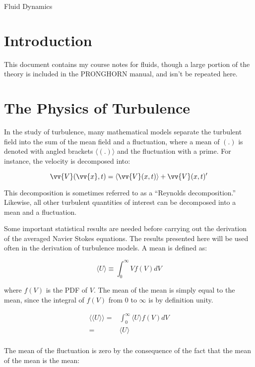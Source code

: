 \documentclass[10pt]{article}
\newcommand{\beq}{\begin{equation}}
\newcommand{\eeq}{\end{equation}}
\newcommand{\beqa}{\begin{equation}\begin{aligned}}
\newcommand{\eeqa}{\end{aligned}\end{equation}}
\newcommand{\la}{\langle}
\newcommand{\ra}{\rangle}
\begin{document}
\begin{centering}
\large Fluid Dynamics\\
\end{centering}

\tableofcontents
\clearpage

\section{Introduction}
\begin{flushleft}\justify

This document contains my course notes for fluids, though a large portion of the theory is included in the PRONGHORN manual, and isn't be repeated here.

\section{The Physics of Turbulence}

In the study of turbulence, many mathematical models separate the turbulent field into the sum of the mean field and a fluctuation, where a mean of \((.)\) is denoted with angled brackets \(\la(.)\ra\) and the fluctuation with a prime. For instance, the velocity is decomposed into:

\beq
\vv{V}(\vv{x},t)=\la\vv{V}(x,t)\rangle+\vv{V}(x,t)'
\eeq

This decomposition is sometimes referred to as a ``Reynolds decomposition.'' Likewise, all other turbulent quantities of interest can be decomposed into a mean and a fluctuation. 

\begin{tcolorbox}[breakable]
Some important statistical results are needed before carrying out the derivation of the averaged Navier Stokes equations. The results presented here will be used often in the derivation of turbulence models. A mean is defined as:

\beq
\la U\ra\equiv\int_{0}^{\infty}Vf(V)dV
\eeq

where \(f(V)\) is the PDF of \(V\). The mean of the mean is simply equal to the mean, since the integral of \(f(V)\) from 0 to \(\infty\) is by definition unity. 

\beqa
\la\la U\ra\ra=&\int_{0}^{\infty}\la U\ra f(V)dV\\
=&\la U\ra\\
\eeqa

The mean of the fluctuation is zero by the consequence of the fact that the mean of the mean is the mean:


\end{tcolorbox}
\end{flushleft}
\end{document}

